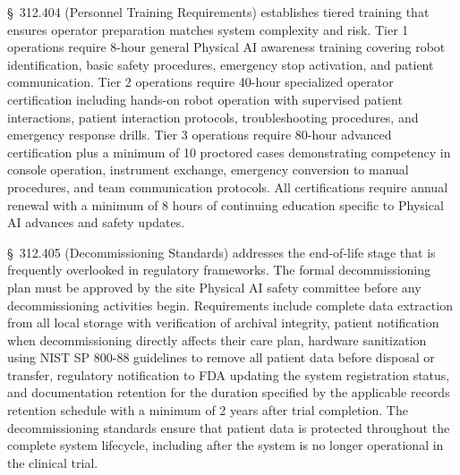 \S~312.404 (Personnel Training Requirements) establishes tiered training that
ensures operator preparation matches system complexity and risk. Tier 1
operations require 8-hour general Physical AI awareness training covering robot
identification, basic safety procedures, emergency stop activation, and
patient communication. Tier 2 operations require 40-hour specialized operator
certification including hands-on robot operation with supervised patient
interactions, patient interaction protocols, troubleshooting procedures, and
emergency response drills. Tier 3 operations require 80-hour advanced
certification plus a minimum of 10 proctored cases demonstrating competency in
console operation, instrument exchange, emergency conversion to manual
procedures, and team communication protocols. All certifications require annual
renewal with a minimum of 8 hours of continuing education specific to Physical
AI advances and safety updates.

\S~312.405 (Decommissioning Standards) addresses the end-of-life stage that is
frequently overlooked in regulatory frameworks. The formal decommissioning plan
must be approved by the site Physical AI safety committee before any
decommissioning activities begin. Requirements include complete data extraction
from all local storage with verification of archival integrity, patient
notification when decommissioning directly affects their care plan, hardware
sanitization using NIST SP 800-88 guidelines to remove all patient data before
disposal or transfer, regulatory notification to FDA updating the system
registration status, and documentation retention for the duration specified by
the applicable records retention schedule with a minimum of 2 years after trial
completion. The decommissioning standards ensure that patient data is protected
throughout the complete system lifecycle, including after the system is no
longer operational in the clinical trial.
